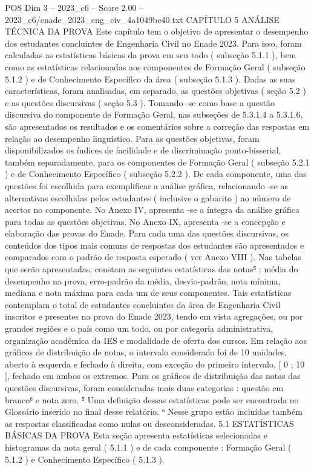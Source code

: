 \begin{textsample}{POS Dim 3 – 2023\_c6 – Score 2.00 – 2023\_c6/enade\_2023\_eng\_civ\_4a1049be40.txt}  \label{ex:f3_pos_106}
CAPÍTULO 5 ANÁLISE TÉCNICA DA PROVA Este capítulo tem o objetivo de apresentar o desempenho dos estudantes concluintes de Engenharia Civil no Enade 2023.
Para isso, foram calculadas as estatísticas básicas da prova em seu todo ( subseção 5.1.1 ), bem como as estatísticas relacionadas aos componentes de Formação Geral ( subseção 5.1.2 ) e de Conhecimento Específico da área ( subseção 5.1.3 ).
Dadas as suas características, foram analisadas, em separado, as questões objetivas ( seção 5.2 ) e as questões discursivas ( seção 5.3 ).
Tomando -se como base a questão discursiva do componente de Formação Geral, nas subseções de 5.3.1.4 a 5.3.1.6, são apresentados os resultados e os comentários sobre a correção das respostas em relação ao desempenho linguístico.
Para as questões objetivas, foram disponibilizados os índices de facilidade e de discriminação ponto-bisserial, também separadamente, para os componentes de Formação Geral ( subseção 5.2.1 ) e de Conhecimento Específico ( subseção 5.2.2 ).
De cada componente, uma das questões foi escolhida para exemplificar a análise gráfica, relacionando -se as alternativas escolhidas pelos estudantes ( inclusive o gabarito ) ao número de acertos no componente.
No Anexo IV, apresenta -se a íntegra da análise gráfica para todas as questões objetivas.
No Anexo IX, apresenta -se a concepção e elaboração das provas do Enade.
Para cada uma das questões discursivas, os conteúdos dos tipos mais comuns de respostas dos estudantes são apresentados e comparados com o padrão de resposta esperado ( ver Anexo VIII ).
Nas tabelas que serão apresentadas, constam as seguintes estatísticas das notas⁵ : média do desempenho na prova, erro-padrão da média, desvio-padrão, nota mínima, mediana e nota máxima para cada um de seus componentes.
Tais estatísticas contemplam o total de estudantes concluintes da área de Engenharia Civil inscritos e presentes na prova do Enade 2023, tendo em vista agregações, ou por grandes regiões e o país como um todo, ou por categoria administrativa, organização acadêmica da IES e modalidade de oferta dos cursos.
Em relação aos gráficos de distribuição de notas, o intervalo considerado foi de 10 unidades, aberto à esquerda e fechado à direita, com exceção do primeiro intervalo, [ 0 ; 10 ], fechado em ambos os extremos.
Para os gráficos de distribuição das notas das questões discursivas, foram consideradas mais duas categorias : questão em branco⁶ e nota zero. ⁵ Uma definição dessas estatísticas pode ser encontrada no Glossário inserido no final desse relatório. ⁶ Nesse grupo estão incluídas também as respostas classificadas como nulas ou desconsideradas. 5.1 ESTATÍSTICAS BÁSICAS DA PROVA Esta seção apresenta estatísticas selecionadas e histogramas da nota geral ( 5.1.1 ) e de cada componente : Formação Geral ( 5.1.2 ) e Conhecimento Específico ( 5.1.3 ).

\end{textsample}
